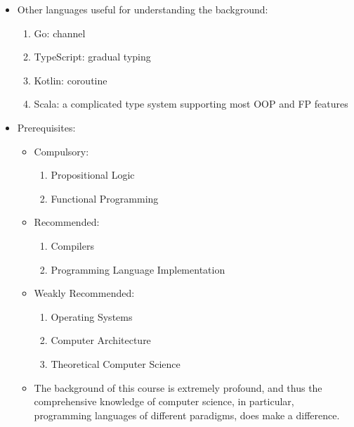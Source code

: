 \documentclass{article}
\begin{document}
\begin{itemize}
\begin{itemize}
\begin{itemize}
\begin{itemize}
\begin{enumerate}
                        \end{enumerate}
                        \item Other languages useful for understanding the background:
                        \begin{enumerate}
                            \item Go: channel
                            \item TypeScript: gradual typing
                            \item Kotlin: coroutine
                            \item Scala: a complicated type system supporting most OOP and FP features
                        \end{enumerate}
                        \item Prerequisites:
                        \begin{itemize}
                            \item Compulsory:
                            \begin{enumerate}
                                \item Propositional Logic
                                \item Functional Programming
                            \end{enumerate}
                            \item Recommended:
                            \begin{enumerate}
                                \item Compilers
                                \item Programming Language Implementation
                            \end{enumerate}
                            \item Weakly Recommended:
                            \begin{enumerate}
                                \item Operating Systems
                                \item Computer Architecture
                                \item Theoretical Computer Science
                            \end{enumerate}
                            \item The background of this course is extremely profound, and thus the comprehensive knowledge of computer science, in particular, programming languages of different paradigms, does make a difference.
                        \end{itemize}


\end{itemize}
\end{itemize}
\end{itemize}
\end{itemize}
\end{document}
